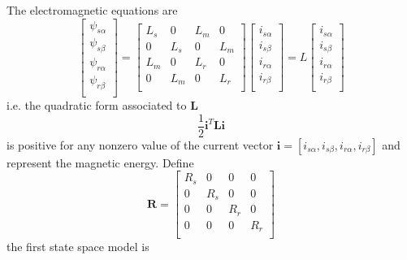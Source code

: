 \documentclass[11pt,a4paper,oneside]{book}
\numberwithin{equation}{section}
\theoremstyle{it}
\theoremstyle{definition}
\begin{document}
The electromagnetic equations are
\begin{equation}\label{eq39}
	\left[\begin{matrix}
		\psi_{s\alpha} \\[6pt]
		\psi_{s\beta} \\[6pt]
		\psi_{r\alpha} \\[6pt]
		\psi_{r\beta} \\[6pt]
	\end{matrix}\right] = 
	\left[\begin{matrix}
		L_s & 0 & L_m & 0 \\[6pt]
		0 & L_s & 0 & L_m \\[6pt]
		L_m & 0 & L_r & 0 \\[6pt]
		0 & L_m & 0 & L_r \\[6pt]
	\end{matrix}\right]
	\left[\begin{matrix}
		i_{s\alpha} \\[6pt]
		i_{s\beta} \\[6pt]
		i_{r\alpha} \\[6pt]
		i_{r\beta} \\[6pt]
	\end{matrix}\right] = L
	\left[\begin{matrix}
		i_{s\alpha} \\[6pt]
		i_{s\beta} \\[6pt]
		i_{r\alpha} \\[6pt]
		i_{r\beta} \\[6pt]
	\end{matrix}\right]
\end{equation}
i.e. the quadratic form associated to $\mathbf{L}$
\begin{equation}\label{eq40}
	\frac{1}{2}\mathbf{i}^T\mathbf{L}\mathbf{i}
\end{equation}
is positive for any nonzero value of the current vector $\mathbf{i}=[i_{s\alpha}, i_{s\beta}, i_{r\alpha}, i_{r\beta}]$ and represent the magnetic energy.
Define 
\begin{equation}\label{eq42}
	\mathbf{R}=
	\left[\begin{matrix}
		R_s & 0 & 0 & 0 \\[6pt]
		0 & R_s & 0 & 0 \\[6pt]
		0 & 0 & R_r & 0 \\[6pt]
		0 & 0 & 0 & R_r \\[6pt]
	\end{matrix}\right]
\end{equation}
the first state space model is
\end{document}

